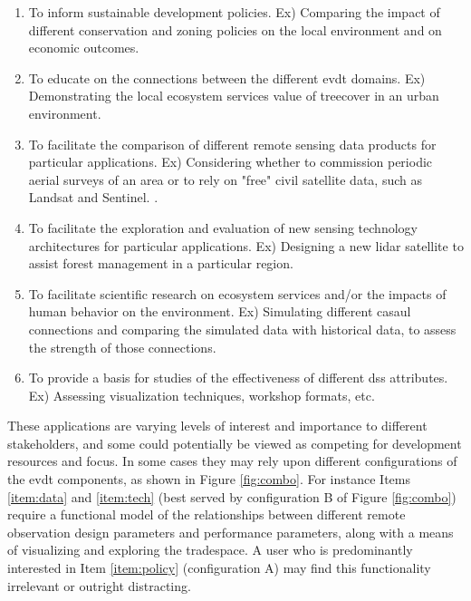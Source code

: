 \documentclass[notitlepage]{article}
\begin{document}
\begin{enumerate} \setlength{\itemsep}{0pt} \setlength{\parskip}{0pt}
    \item To inform sustainable development policies. \color{OliveGreen} Ex) Comparing the impact of different conservation and zoning policies on the local environment and on economic outcomes. \color{black} \label{item:policy}
    \item To educate on the connections between the different \ac{evdt} domains. \color{OliveGreen} Ex) Demonstrating the local ecosystem services value of treecover in an urban environment.
	\item To facilitate the comparison of different remote sensing data products for particular applications. Ex) Considering whether to commission periodic aerial surveys of an area or to rely on "free" civil satellite data, such as Landsat and Sentinel. \label{item:data}. \color{black}
    \item To facilitate the exploration and evaluation of new sensing technology architectures for particular applications. \color{OliveGreen} Ex) Designing a new \ac{lidar} satellite to assist forest management in a particular region. \color{black} \label{item:tech}
    \item To facilitate scientific research on ecosystem services and/or the impacts of human behavior on the environment. \color{OliveGreen} Ex) Simulating different casaul connections and comparing the simulated data with historical data, to assess the strength of those connections. \color{black}
    \item To provide a basis for studies of the effectiveness of different \ac{dss} attributes. \color{OliveGreen} Ex) Assessing visualization techniques, workshop formats, etc. \color{black} \label{item:user}
\end{enumerate}

These applications are varying levels of interest and importance to different stakeholders, and some could potentially be viewed as competing for development resources and focus. In some cases they may rely upon different configurations of the \ac{evdt} components, as shown in Figure \ref{fig:combo}. \color{OliveGreen} For instance Items \ref{item:data} and \ref{item:tech} (best served by configuration B of Figure \ref{fig:combo}) \color{black} require a functional model of the relationships between different remote observation design parameters and performance parameters, along with a means of visualizing and exploring the tradespace. A user who is predominantly interested in Item \ref{item:policy} \color{OliveGreen} (configuration A) \color{black} may find this functionality irrelevant or outright distracting.
\end{document}
